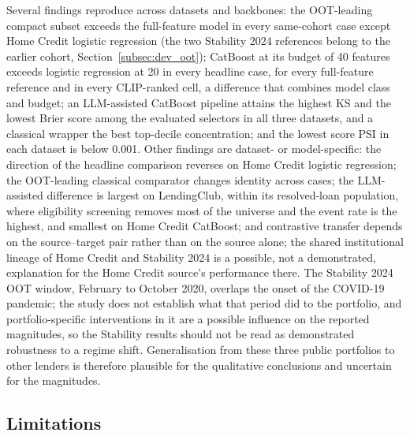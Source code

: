 \documentclass[final,5p,twocolumn]{elsarticle}
\begin{document}
Several findings reproduce across datasets and backbones: the OOT-leading compact subset exceeds the full-feature model in every same-cohort case except Home Credit logistic regression (the two Stability 2024 references belong to the earlier cohort, Section~\ref{subsec:dev_oot}); CatBoost at its budget of 40 features exceeds logistic regression at 20 in every headline case, for every full-feature reference and in every CLIP-ranked cell, a difference that combines model class and budget; an LLM-assisted CatBoost pipeline attains the highest KS and the lowest Brier score among the evaluated selectors in all three datasets, and a classical wrapper the best top-decile concentration; and the lowest score PSI in each dataset is below 0.001. Other findings are dataset- or model-specific: the direction of the headline comparison reverses on Home Credit logistic regression; the OOT-leading classical comparator changes identity across cases; the LLM-assisted difference is largest on LendingClub, within its resolved-loan population, where eligibility screening removes most of the universe and the event rate is the highest, and smallest on Home Credit CatBoost; and contrastive transfer depends on the source--target pair rather than on the source alone; the shared institutional lineage of Home Credit and Stability 2024 is a possible, not a demonstrated, explanation for the Home Credit source's performance there. The Stability 2024 OOT window, February to October 2020, overlaps the onset of the COVID-19 pandemic; the study does not establish what that period did to the portfolio, and portfolio-specific interventions in it are a possible influence on the reported magnitudes, so the Stability results should not be read as demonstrated robustness to a regime shift. Generalisation from these three public portfolios to other lenders is therefore plausible for the qualitative conclusions and uncertain for the magnitudes.

\subsection{Limitations}
\label{subsec:limitations}
\end{document}
